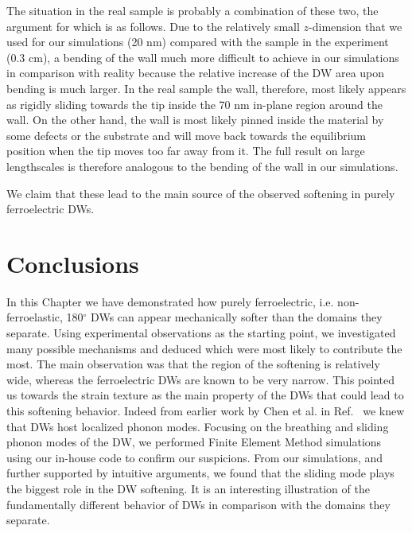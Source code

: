 The situation in the real sample is probably a combination of these two, the argument for which is as follows.
Due to the relatively small $z$-dimension that we used for our simulations (20 nm) compared with the sample in the experiment (0.3 cm), a bending of the wall much more difficult to achieve in our simulations in comparison with reality because the relative increase of the \gls{DW} area upon bending is much larger. 
In the real sample the wall, therefore, most likely appears as rigidly sliding towards the tip inside the 70 nm in-plane region around the wall.
On the other hand, the wall is most likely pinned inside the material by some defects or the substrate and will move back towards the equilibrium position when the tip moves too far away from it. The full result on large lengthscales is therefore analogous to the bending of the wall in our simulations.

We claim that these lead to the main source of the observed softening in purely ferroelectric \glspl{DW}.
\section{Conclusions \label{sec:BTO_conclusion}}

In this Chapter we have demonstrated how purely ferroelectric, i.e. non-ferroelastic, 180$^\circ$ \glspl{DW} can appear mechanically softer than the domains they separate.
Using experimental observations as the starting point, we investigated many possible mechanisms and deduced which were most likely to contribute the most.
The main observation was that the region of the softening is relatively wide, whereas the ferroelectric \glspl{DW} are known to be very narrow.
This pointed us towards the strain texture as the main property of the \glspl{DW} that could lead to this softening behavior.
Indeed from earlier work by Chen et al. in Ref.~\cite{Chen2020} we knew that \glspl{DW} host localized phonon modes.
Focusing on the breathing and sliding phonon modes of the \gls{DW}, we performed Finite Element Method simulations using our in-house code to confirm our suspicions.
From our simulations, and further supported by intuitive arguments, we found that the sliding mode plays the biggest role in the \gls{DW} softening.
It is an interesting illustration of the fundamentally different behavior of \glspl{DW} in comparison with the domains they separate.

